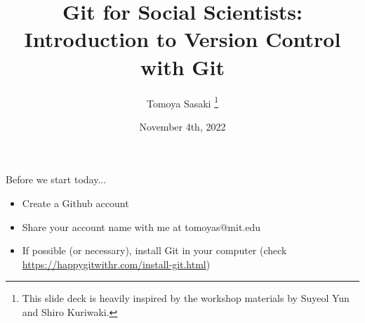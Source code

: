 \documentclass[handout,pdftex,10pt,aspectratio=169]{beamer}
\title[Git workshop]{Git for Social Scientists: Introduction to Version Control with Git}
\author[Tomoya]{Tomoya Sasaki%
\thanks{This slide deck is heavily inspired by the workshop materials by Suyeol Yun and Shiro Kuriwaki.}}
\institute[MIT]{Massachusetts Institute of Technology}
\date[Fall 2022]{November 4th, 2022}
\begin{document}
\begin{frame}{Before we start today...}
  \begin{itemize}
    \item Create a Github account
    \item Share your account name with me at tomoyas@mit.edu
    \item If possible (or necessary), install Git in your computer (check \url{https://happygitwithr.com/install-git.html})
  \end{itemize}
\end{frame}

\begin{frame}
  \titlepage
  \end{frame}
  
\end{document}

